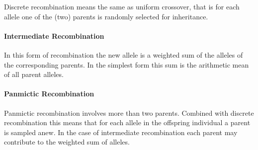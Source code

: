 Discrete recombination means the same as uniform crossover, that is
for each allele one of the (two) parents is randomly selected for
inheritance.


	\paragraph{Intermediate Recombination}

In this form of recombination the new allele is a weighted sum of the
alleles of the corresponding parents.  In the simplest form this sum
is the arithmetic mean of all parent alleles.


	\paragraph{Panmictic Recombination}

Panmictic recombination involves more than two parents.  Combined with
discrete recombination this means that for each allele in the
offspring individual a parent is sampled anew.  In the case of
intermediate recombination each parent may contribute to the weighted
sum of alleles.

